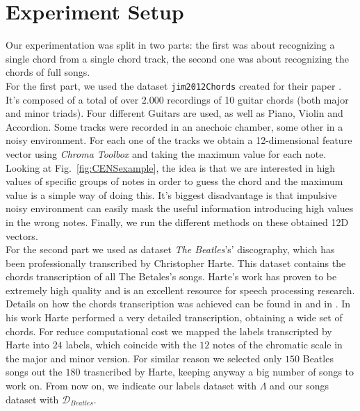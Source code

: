 \section{Experiment Setup}
\label{sec:setup}

Our experimentation was split in two parts: the first was about recognizing a single chord from a single chord track, the second one was about recognizing the chords of full songs.\\
%
For the first part, we used the dataset \texttt{jim2012Chords} \cite{jim2012Chords} created for their paper \cite{JimChordsPaper}. It's composed of a total of over $2.000$ recordings of 10 guitar chords (both major and minor triads). Four different Guitars are used, as well as Piano, Violin and Accordion. Some tracks were recorded in an anechoic chamber, some other in a noisy environment. For each one of the tracks we obtain a 12-dimensional feature vector using \textit{Chroma Toolbox} and taking the maximum value for each note. Looking at Fig.~\ref{fig:CENSexample}, the idea is that we are interested in high values of specific groups of notes in order to guess the chord and the maximum value is a simple way of doing this. It's biggest disadvantage is that impulsive noisy environment can easily mask the useful information introducing high values in the wrong notes. Finally, we run the different methods on these obtained 12D vectors.\\
%
For the second part we used as dataset \textit{The Beatles}'s' discography, which has been professionally transcribed by Christopher Harte. This dataset contains the chords transcription of all The Betales's songs. Harte's work has proven to be extremely high quality and is an excellent resource for speech processing research. Details on how the chords transcription was achieved can be found in \cite{HartePaper} and in \cite{HarteThesis}. In his work Harte performed a very detailed transcription, obtaining a wide set of chords. For reduce computational cost we mapped the labels transcripted by Harte into $24$ labels, which coincide with the $12$ notes of the chromatic scale in the major and minor version. For similar reason we selected only $150$ Beatles songs out the $180$ trasncribed by Harte, keeping anyway a big number of songs to work on. From now on, we indicate our labels dataset with $\Lambda$ and our songs dataset with $\mathcal{D}_{Beatles}$. \\
%
